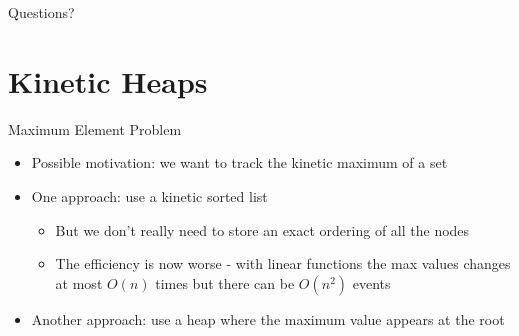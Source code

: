 \documentclass[aspectratio=169, handout]{beamer}
\begin{document}
\begin{frame}{}
      \begin{center}
    {\color{sigma@mainblue} \LARGE Questions?}
  \end{center}
\end{frame}

\section{Kinetic Heaps}
\frame{\sectionpage}

\begin{frame}{Maximum Element Problem}
    \begin{itemize}
        \item Possible motivation: we want to track the kinetic maximum of a set
        \item One approach: use a kinetic sorted list
        \begin{itemize}
            \item But we don't really need to store an exact ordering of all the nodes
            \item The efficiency is now worse - with linear functions the max values changes at most $O(n)$ times but there can be $O(n^2)$ events
        \end{itemize}
        \pause
        \item Another approach: use a heap where the maximum value appears at the root
    \end{itemize}
\end{frame}
\end{document}
